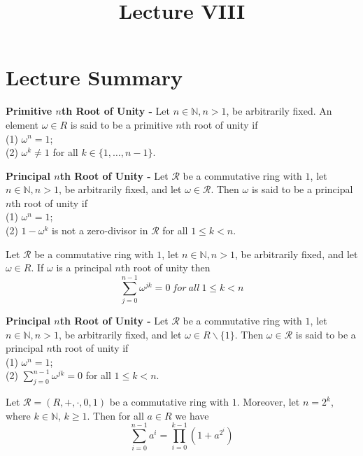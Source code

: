 \documentclass[a4paper]{article}
\title{\vspace{-2cm}Lecture VIII\vspace{-2cm}}
\date{}
\begin{document}
\maketitle
\section{Lecture Summary}
\begin{definition}
\textbf{Primitive $n$th Root of Unity -} Let $n \in \mathbb{N}, n > 1$, be arbitrarily fixed. An element $\omega \in R$ is said to be a primitive $n$th root of unity if \\
(1) $\omega^{n} = 1$; \\
(2) $\omega^{k} \neq 1$ for all $k \in \{1, \ldots, n - 1 \}$.
\end{definition}


\begin{definition}
\textbf{Principal $n$th Root of Unity -} Let $\mathcal{R}$ be a commutative ring with $1$, let $n \in \mathbb{N}, n > 1$, be arbitrarily fixed, and let $\omega \in \mathcal{R}$. Then $\omega$ is said to be a principal $n$th root of unity if \\
(1) $\omega^{n} = 1$; \\
(2) $1 - \omega^{k}$ is not a zero-divisor in $\mathcal{R}$ for all $1 \leq k < n$.
\end{definition}


\begin{lemma}
Let $\mathcal{R}$ be a commutative ring with $1$, let $n \in \mathbb{N}, n >1$, be arbitrarily fixed, and let $\omega \in R$. If $\omega$ is a principal $n$th root of unity then
$$\sum_{j=0}^{n-1} \omega^{jk} = 0\ for\ all\ 1 \leq k < n$$
\end{lemma}


\begin{definition}
\textbf{Principal $n$th Root of Unity -} Let $\mathcal{R}$ be a commutative ring with $1$, let $n \in \mathbb{N}, n > 1$, be arbitrarily fixed, and let $\omega \in R \backslash \{1\}$. Then $\omega \in \mathcal{R}$ is said to be a principal $n$th root of unity if \\
(1) $\omega^{n} = 1$; \\
(2) $\sum_{j = 0}^{n -1} \omega^{jk} = 0$ for all $1 \leq k < n$.
\end{definition}


\begin{lemma}
Let $\mathcal{R} = (R, +, \cdot, 0, 1)$ be a commutative ring with $1$. Moreover, let $n = 2^{k}$, where $k \in \mathbb{N}$, $k \geq 1$. Then for all $a \in R$ we have
$$\sum_{i=0}^{n-1}a^{i} = \prod_{i=0}^{k-1}\left( 1+a^{2^{i}} \right)$$
\end{lemma}
\end{document}
